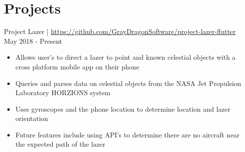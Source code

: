 \documentclass{article}
\begin{document}
\section*{Projects}
Project Lazer | \url{https://github.com/GrayDragonSoftware/project-lazer-flutter} \\
May 2018 - Present
\begin{itemize}
	\item Allows user's to direct a lazer to point and known celestial objects with a cross platform mobile app on their phone
	\item Queries and parses data on celestial objects from the NASA Jet Propulsion Laboratory HORZIONS system
	\item Uses gyroscopes and the phone location to determine location and lazer orientation
	\item Future features include using API's to determine there are no aircraft near the expected path of the lazer
\end{itemize}
\end{document}
